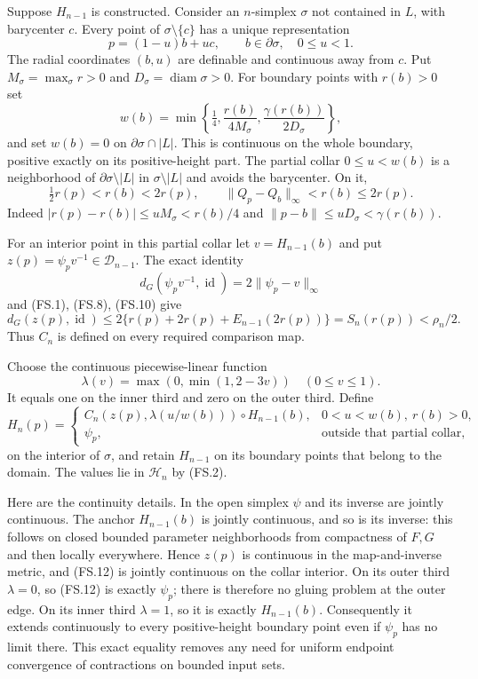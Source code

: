 Suppose $H_{n-1}$ is constructed. Consider an $n$-simplex $\sigma$ not
contained in $L$, with barycenter $c$. Every point of
$\sigma\setminus\{c\}$ has a unique representation
\[
 p=(1-u)b+uc,\qquad b\in\partial\sigma,\quad0\le u<1.
\]
The radial coordinates $(b,u)$ are definable and continuous away from $c$.
Put $M_\sigma=\max_\sigma r>0$ and $D_\sigma=\operatorname{diam}\sigma>0$.
For boundary points with $r(b)>0$ set
\[
 w(b)=\min\left\{\tfrac14,
       \frac{r(b)}{4M_\sigma},\frac{\gamma(r(b))}{2D_\sigma}\right\},
 \tag{FS.9}
\]
and set $w(b)=0$ on $\partial\sigma\cap|L|$. This is continuous on the
whole boundary, positive exactly on its positive-height part. The partial
collar $0\le u<w(b)$ is a neighborhood of
$\partial\sigma\setminus|L|$ in $\sigma\setminus|L|$ and avoids the
barycenter. On it,
\[
 \tfrac12r(p)<r(b)<2r(p),\qquad
 \|Q_p-Q_b\|_\infty<r(b)\le2r(p).
 \tag{FS.10}
\]
Indeed $|r(p)-r(b)|\le uM_\sigma<r(b)/4$ and
$\|p-b\|\le uD_\sigma<\gamma(r(b))$.

For an interior point in this partial collar let $v=H_{n-1}(b)$ and put
$z(p)=\psi_pv^{-1}\in\mathcal D_{n-1}$. The exact identity
\[
 d_G(\psi_pv^{-1},\operatorname{id})
       =2\|\psi_p-v\|_\infty
 \tag{FS.11}
\]
and (FS.1), (FS.8), (FS.10) give
\[
 d_G(z(p),\operatorname{id})
 \le 2\{r(p)+2r(p)+E_{n-1}(2r(p))\}
 =S_n(r(p))<\rho_n/2.
\]
Thus $C_n$ is defined on every required comparison map.

Choose the continuous piecewise-linear function
\[
 \lambda(v)=\max(0,\min(1,2-3v))\quad(0\le v\le1).
\]
It equals one on the inner third and zero on the outer third. Define
\[
 H_n(p)=
 \begin{cases}
 C_n(z(p),\lambda(u/w(b)))\circ H_{n-1}(b),
       &0<u<w(b),\ r(b)>0,\\
 \psi_p,&\text{outside that partial collar},
 \end{cases}
 \tag{FS.12}
\]
on the interior of $\sigma$, and retain $H_{n-1}$ on its boundary points
that belong to the domain. The values lie in $\mathcal H_n$ by (FS.2).

Here are the continuity details. In the open simplex $\psi$ and its inverse
are jointly continuous. The anchor $H_{n-1}(b)$ is jointly continuous, and
so is its inverse: this follows on closed bounded parameter neighborhoods
from compactness of $F,G$ and then locally everywhere. Hence $z(p)$ is
continuous in the map-and-inverse metric, and (FS.12) is jointly continuous
on the collar interior. On its outer third $\lambda=0$, so (FS.12) is
exactly $\psi_p$; there is therefore no gluing problem at the outer edge.
On its inner third $\lambda=1$, so it is exactly $H_{n-1}(b)$. Consequently
it extends continuously to every positive-height boundary point even if
$\psi_p$ has no limit there. This exact equality removes any need for
uniform endpoint convergence of contractions on bounded input sets.

